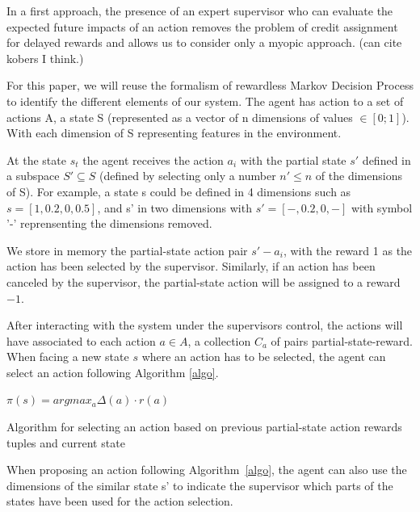 \documentclass[letterpaper]{article} %
\begin{document}
In a first approach, the presence of an expert supervisor who can evaluate the
expected future impacts of an action removes the problem of credit assignment
for delayed rewards and allows us to consider only a myopic approach. (can cite
kobers I think.)

For this paper, we will reuse the formalism of rewardless Markov Decision 
Process to identify the different elements of our system. The agent has action
to a set of actions A, a state S (represented as a vector of n dimensions of
values $\in [0;1]$). With each dimension of S representing features in the
environment.

At the state $s_{t}$ the agent receives the action $a_{i}$ with the partial
state $s'$ defined in a subspace $S' \subseteq S$ (defined by selecting only a
number $n' \leq n$ of the dimensions of S). For example, a state s could be
defined in 4 dimensions such as $s=[1,0.2,0,0.5]$, and s' in two dimensions with
$s'=[-,0.2,0,-]$ with symbol '-' reprensenting the dimensions removed.

We store in memory the partial-state action pair $s'-a_{i}$, with the reward 1
as the action has been selected by the supervisor. Similarly, if an action has
been canceled by the supervisor, the partial-state action will be assigned to a
reward $-1$.

After interacting with the system under the supervisors control, the actions
will have associated to each action $a \in A$, a collection $C_{a}$ of pairs
partial-state-reward. When facing a new state $s$ where an action has to be
selected, the agent can select an action following Algorithm \ref{algo}.

\begin{algorithm}
    \DontPrintSemicolon
    $\pi(s) = argmax_{a}\Delta(a) \cdot r(a)$

    \caption{Algorithm for selecting an action based on previous
    partial-state action rewards tuples and current state}
    \label{algo}
\end{algorithm}

When proposing an action following Algorithm~\ref{algo}, the agent can also use
the dimensions of the similar state s' to indicate the supervisor which parts of
the states have been used for the action selection.
\end{document}
